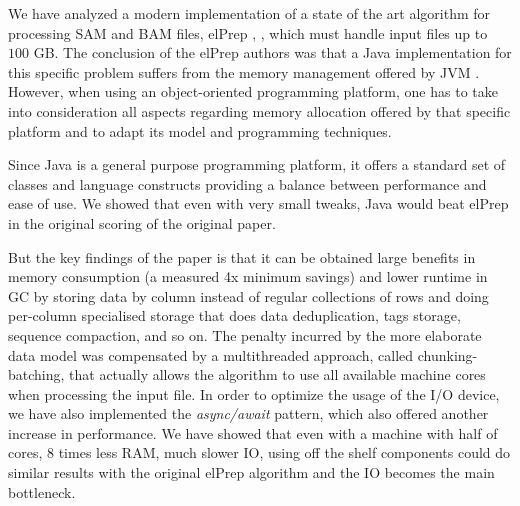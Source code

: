 \documentclass[a4paper,twoside]{article}
\begin{document}
We have analyzed a modern implementation of a state of the art algorithm for processing SAM and BAM files, elPrep \cite{herzeel:2015}, \cite{herzeel:2019}, which must handle input files up to $100$ GB. 
The conclusion of the elPrep authors was that a Java implementation for this specific problem suffers from the memory management offered by JVM \cite{costanza:2019}.
However, when using an object-oriented programming platform, one has to take into consideration all aspects regarding memory allocation offered by that specific platform and to adapt its model and programming techniques.

Since Java is a general purpose programming platform, it offers a standard set of classes and language constructs providing a balance between performance and ease of use. 
We showed that even with very small tweaks, Java would beat elPrep in the original scoring of the original paper.

But the key findings of the paper is that it can be obtained large benefits in memory consumption (a measured 4x minimum savings) and lower runtime in GC by storing data by column instead of regular collections of rows and doing per-column specialised storage that does data deduplication, tags storage, sequence compaction, and so on.
The penalty incurred by the more elaborate data model was compensated by a multithreaded approach, called chunking-batching, that actually allows the algorithm to use all available machine cores when processing the input file.
In order to optimize the usage of the I/O device, we have also implemented the {\textit{async/await} } pattern, which also offered another increase in performance.
We have showed that even with a machine with half of cores, $8$ times less RAM, much slower IO, using off the shelf components could do similar results with the original elPrep algorithm and the IO becomes the main bottleneck.






{\small
}
\end{document}
